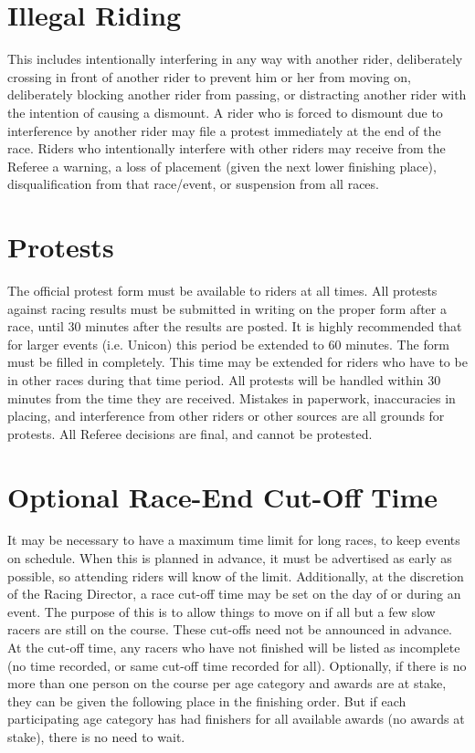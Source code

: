 \section{Illegal Riding}
This includes intentionally interfering in any way with another rider, deliberately crossing in front of another rider to prevent him or her from moving on, deliberately blocking another rider from passing, or distracting another rider with the intention of causing a dismount.
A rider who is forced to dismount due to interference by another rider may file a protest immediately at the end of the race.
Riders who intentionally interfere with other riders may receive from the Referee a warning, a loss of placement (given the next lower finishing place), disqualification from that race/event, or suspension from all races.

\section{Protests}
The official protest form must be available to riders at all times.
All protests against racing results must be submitted in writing on the proper form after a race, until 30 minutes after the results are posted.
It is highly recommended that for larger events (i.e. Unicon) this period be extended to 60 minutes.
The form must be filled in completely.
This time may be extended for riders who have to be in other races during that time period.
All protests will be handled within 30 minutes from the time they are received.
Mistakes in paperwork, inaccuracies in placing, and interference from other riders or other sources are all grounds for protests.
All Referee decisions are final, and cannot be protested.

\section{Optional Race-End Cut-Off Time}
It may be necessary to have a maximum time limit for long races, to keep events on schedule.
When this is planned in advance, it must be advertised as early as possible, so attending riders will know of the limit.
Additionally, at the discretion of the Racing Director, a race cut-off time may be set on the day of or during an event.
The purpose of this is to allow things to move on if all but a few slow racers are still on the course.
These cut-offs need not be announced in advance.
At the cut-off time, any racers who have not finished will be listed as incomplete (no time recorded, or same cut-off time recorded for all).
Optionally, if there is no more than one person on the course per age category and awards are at stake, they can be given the following place in the finishing order.
But if each participating age category has had finishers for all available awards (no awards at stake), there is no need to wait.

